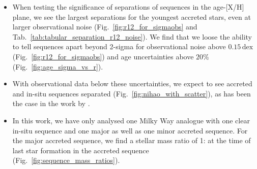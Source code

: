 \documentclass[fleqn,usenatbib]{mnras}
\begin{document}
\begin{itemize}
    \item When testing the significance of separations of sequences in the age-[X/H] plane, we see the largest separations for the youngest accreted stars, even at larger observational noise (Fig.~\ref{fig:r12_for_sigmaobs} and Tab.~\ref{tab:tabular_separation_r12_noise}). We find that we loose the ability to tell sequences apart beyond 2-sigma for observational noise above $0.15\,\mathrm{dex}$ (Fig.~\ref{fig:r12_for_sigmaobs}) and age uncertainties above $20\%$ (Fig.~\ref{fig:age_sigma_vs_r}).
    \item With observational data below these uncertainties, we expect to see accreted and in-situ sequences separated (Fig.~\ref{fig:nihao_with_scatter}), as has been the case in the work by \citet{Xiang2022}.
    \item In this work, we have only analysed one Milky Way analogue with one clear in-situ sequence and one major as well as one minor accreted sequence. For the major accreted sequence, we find a stellar mass ratio of 1: at the time of last star formation in the accreted sequence (Fig.~\ref{fig:sequence_mass_ratios}).
\end{itemize}
\end{document}
